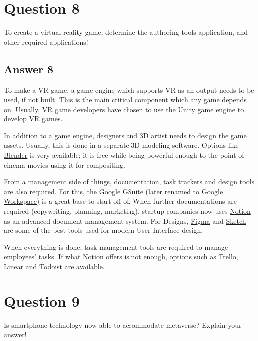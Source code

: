 \documentclass[
  11pt, %
]{assignment}
\begin{document}
\section*{Question 8}

\begin{problem}
To create a virtual reality game, determine the authoring tools application, and other required applications!
\end{problem}

\subsection*{Answer 8}

To make a VR game, a game engine which supports VR as an output needs to be used, if not built. This is the main critical component which any game depends on. Usually, VR game developers have chosen to use the \href{https://unity.com}{Unity game engine} to develop VR games.

In addition to a game engine, designers and 3D artist needs to design the game assets. Usually, this is done in a separate 3D modeling software. Options like \href{https://blender.org}{Blender} is very available; it is free while being powerful enough to the point of cinema movies using it for compositing.

From a management side of things, documentation, task trackers and design tools are also required. For this, the \href{https://workspace.google.com}{Google GSuite (later renamed to Google Workspace)} is a great base to start off of. When further documentations are required (copywriting, planning, marketing), startup companies now uses \href{https://notion.so}{Notion} as an advanced document management system. For Designs, \href{https://figma.com}{Figma} and \href{https://sketch.com}{Sketch} are some of the best tools used for modern User Interface design.

When everything is done, task management tools are required to manage employees' tasks. If what Notion offers is not enough, options such as \href{https://trello.com}{Trello}, \href{https://linear.com}{Linear} and \href{https://todoist.com}{Todoist} are available.

\section*{Question 9}

\begin{problem}
Is smartphone technology now able to accommodate metaverse? Explain your answer!
\end{problem}
\end{document}
